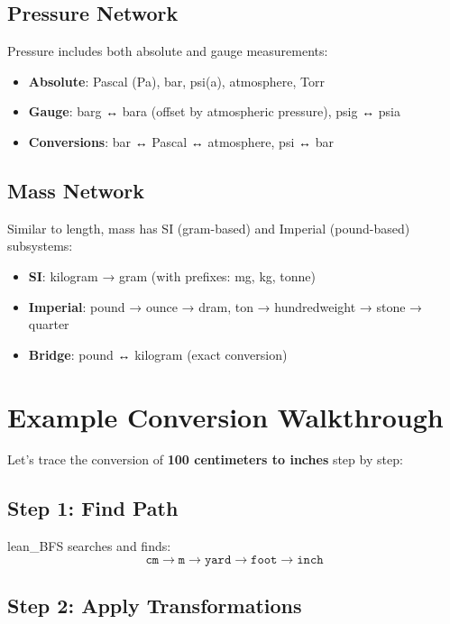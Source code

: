 \documentclass[11pt,a4paper]{report}
\begin{document}
\subsection{Pressure Network}

Pressure includes both absolute and gauge measurements:
\begin{itemize}[leftmargin=*]
  \item \textbf{Absolute}: Pascal (Pa), bar, psi(a), atmosphere, Torr
  \item \textbf{Gauge}: barg ↔ bara (offset by atmospheric pressure), psig ↔ psia
  \item \textbf{Conversions}: bar ↔ Pascal ↔ atmosphere, psi ↔ bar
\end{itemize}

\subsection{Mass Network}

Similar to length, mass has SI (gram-based) and Imperial (pound-based) subsystems:
\begin{itemize}[leftmargin=*]
  \item \textbf{SI}: kilogram → gram (with prefixes: mg, kg, tonne)
  \item \textbf{Imperial}: pound → ounce → dram, ton → hundredweight → stone → quarter
  \item \textbf{Bridge}: pound ↔ kilogram (exact conversion)
\end{itemize}

\section{Example Conversion Walkthrough}

Let's trace the conversion of \textbf{100 centimeters to inches} step by step:

\subsection{Step 1: Find Path}

lean\_BFS searches and finds:
\[
\texttt{cm} \rightarrow \texttt{m} \rightarrow \texttt{yard} \rightarrow \texttt{foot} \rightarrow \texttt{inch}
\]

\subsection{Step 2: Apply Transformations}
\end{document}
